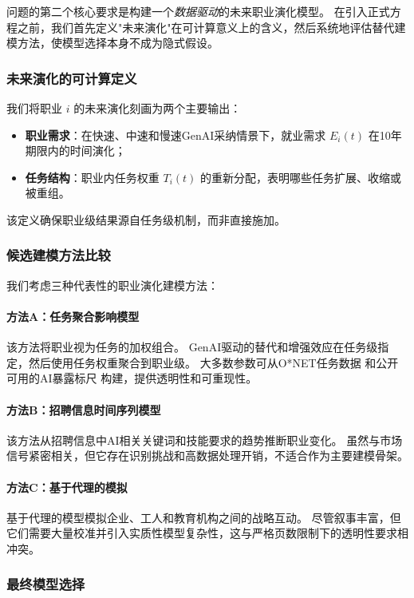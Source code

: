 问题的第二个核心要求是构建一个\emph{数据驱动}的未来职业演化模型。
在引入正式方程之前，我们首先定义"未来演化"在可计算意义上的含义，然后系统地评估替代建模方法，使模型选择本身不成为隐式假设。

\subsubsection{未来演化的可计算定义}

我们将职业 $i$ 的未来演化刻画为两个主要输出：
\begin{itemize}
    \item \textbf{职业需求}：在快速、中速和慢速GenAI采纳情景下，就业需求 $E_i(t)$ 在10年期限内的时间演化；
    \item \textbf{任务结构}：职业内任务权重 $T_i(t)$ 的重新分配，表明哪些任务扩展、收缩或被重组。
\end{itemize}

该定义确保职业级结果源自任务级机制，而非直接施加。

\subsubsection{候选建模方法比较}

我们考虑三种代表性的职业演化建模方法：

\paragraph{方法A：任务聚合影响模型}
该方法将职业视为任务的加权组合。
GenAI驱动的替代和增强效应在任务级指定，然后使用任务权重聚合到职业级。
大多数参数可从O*NET任务数据 \cite{onet2025database} 和公开可用的AI暴露标尺 \cite{freyosborne2017} 构建，提供透明性和可重现性。

\paragraph{方法B：招聘信息时间序列模型}
该方法从招聘信息中AI相关关键词和技能要求的趋势推断职业变化。
虽然与市场信号紧密相关，但它存在识别挑战和高数据处理开销，不适合作为主要建模骨架。

\paragraph{方法C：基于代理的模拟}
基于代理的模型模拟企业、工人和教育机构之间的战略互动。
尽管叙事丰富，但它们需要大量校准并引入实质性模型复杂性，这与严格页数限制下的透明性要求相冲突。

\subsubsection{最终模型选择}

